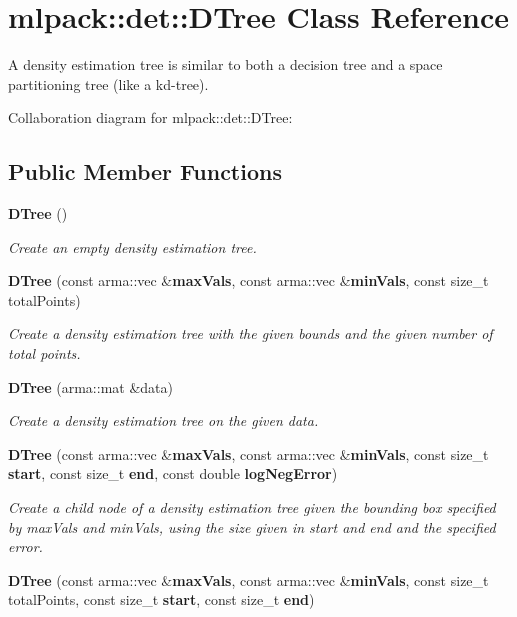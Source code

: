 \section{mlpack\-:\-:det\-:\-:D\-Tree Class Reference}
\label{classmlpack_1_1det_1_1DTree}


A density estimation tree is similar to both a decision tree and a space partitioning tree (like a kd-\/tree).  




Collaboration diagram for mlpack\-:\-:det\-:\-:D\-Tree\-:
\subsection*{Public Member Functions}
\begin{DoxyCompactItemize}
\item 
{\bf D\-Tree} ()
\begin{DoxyCompactList}\small\item\em Create an empty density estimation tree. \end{DoxyCompactList}\item 
{\bf D\-Tree} (const arma\-::vec \&{\bf max\-Vals}, const arma\-::vec \&{\bf min\-Vals}, const size\-\_\-t total\-Points)
\begin{DoxyCompactList}\small\item\em Create a density estimation tree with the given bounds and the given number of total points. \end{DoxyCompactList}\item 
{\bf D\-Tree} (arma\-::mat \&data)
\begin{DoxyCompactList}\small\item\em Create a density estimation tree on the given data. \end{DoxyCompactList}\item 
{\bf D\-Tree} (const arma\-::vec \&{\bf max\-Vals}, const arma\-::vec \&{\bf min\-Vals}, const size\-\_\-t {\bf start}, const size\-\_\-t {\bf end}, const double {\bf log\-Neg\-Error})
\begin{DoxyCompactList}\small\item\em Create a child node of a density estimation tree given the bounding box specified by max\-Vals and min\-Vals, using the size given in start and end and the specified error. \end{DoxyCompactList}\item 
{\bf D\-Tree} (const arma\-::vec \&{\bf max\-Vals}, const arma\-::vec \&{\bf min\-Vals}, const size\-\_\-t total\-Points, const size\-\_\-t {\bf start}, const size\-\_\-t {\bf end})

\end{DoxyCompactItemize}
